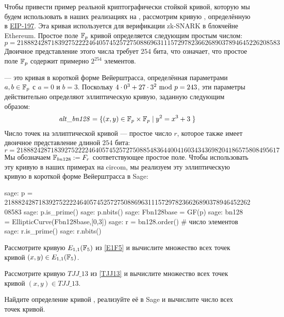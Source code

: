 \begin{example}\label{BN128}
Чтобы привести пример реальной криптографически стойкой кривой, которую мы будем использовать в наших реализациях на , рассмотрим кривую , определённую в \href{https://github.com/ethereum/EIPs/blob/master/EIPS/eip-197.md}{EIP-197}. Эта кривая используется для верификации zk-SNARK в блокчейне Ethereum. Простое поле $\mathbb{F}_p$ кривой  определяется следующим простым числом:
$$
p = \scriptstyle 21888242871839275222246405745257275088696311157297823662689037894645226208583
$$
Двоичное представление этого числа требует $254$ бита, что означает, что простое поле $\mathbb{F}_p$ содержит примерно $2^{254}$ элементов. 

 — это кривая в короткой форме Вейерштрасса, определённая параметрами $a,b\in \mathbb{F}_p$ с $a=0$ и $b=3$. Поскольку $4\cdot 0^3 + 27\cdot 3^2 \text{ mod } p=243$, эти параметры действительно определяют эллиптическую кривую, заданную следующим образом:
$$
\mathit{alt\_bn128} = \{(x,y)\in \mathbb{F}_p\times \mathbb{F}_p \;|\; y^2 = x^3 +3\;\} 
$$
Число точек на эллиптической кривой  — простое число $r$, которое также имеет двоичное представление длиной $254$ бита:
$$
r = \scriptstyle 21888242871839275222246405745257275088548364400416034343698204186575808495617
$$
Мы обозначаем $\mathbb{F}_{bn128}:=F_r$ соответствующее простое поле. Чтобы использовать эту кривую в наших примерах на circom, мы реализуем эту эллиптическую кривую в короткой форме Вейерштрасса в Sage:
\begin{sagecommandline}
sage: p = 21888242871839275222246405745257275088696311157297823662689037894645226208583
sage: p.is_prime()
sage: p.nbits()
sage: Fbn128base = GF(p)
sage: bn128 = EllipticCurve(Fbn128base,[0,3])
sage: r = bn128.order() # число элементов
sage: r.is_prime()
sage: r.nbits()
\end{sagecommandline}
\end{example}

\begin{exercise} Рассмотрите кривую $E_{1,1}(\mathbb{F}_5)$ из \examplename{} \ref{E1F5} и вычислите множество всех точек кривой $(x,y)\in E_{1,1}(\mathbb{F}_5)$.
\end{exercise}
\begin{exercise} Рассмотрите кривую $TJJ\_13$ из \examplename{} \ref{TJJ13} и вычислите множество всех точек кривой $(x,y)\in TJJ\_13$.
\end{exercise}
\begin{exercise}
Найдите определение кривой , реализуйте её в Sage и вычислите число всех точек кривой.
\end{exercise}
